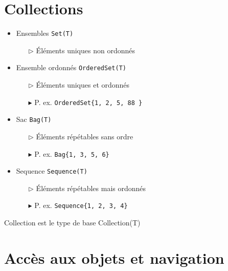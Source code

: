 \documentclass[16pt]{report}
\begin{document}
\begin{multicols*}{2}
        \section{Collections}
        \begin{itemize}
            \item \textcolor{myb}{Ensembles \texttt{Set(T)}}    
            \begin{itemize}
                \item[$\rhd$] Éléments uniques non ordonnés
            \end{itemize}
            \item \textcolor{myb}{Ensemble ordonnés \texttt{OrderedSet(T)}  }  
            \begin{itemize}
                \item[$\rhd$] Éléments uniques et ordonnés 
                \item[$\blacktriangleright$] P. ex. \texttt{OrderedSet\{1, 2, 5, 88 \}}
            \end{itemize}
        \item \textcolor{myb}{Sac \texttt{Bag(T)}}  
            \begin{itemize}
                \item[$\rhd$] Éléments répétables sans ordre 
                \item[$\blacktriangleright$] P. ex. \texttt{Bag\{1, 3, 5, 6\}}
            \end{itemize}
        \item \textcolor{myb}{Sequence \texttt{Sequence(T)}}  
            \begin{itemize}
                \item[$\rhd$] Éléments répétables mais ordonnés 
                \item[$\blacktriangleright$] P. ex. \texttt{Sequence\{1, 2, 3, 4\}}  
            \end{itemize}
        \end{itemize}

        \begin{note}{}{}
            Collection est le type de base Collection(T)
        \end{note}

        \section{Accès aux objets et navigation}



\end{multicols*}
\end{document}
